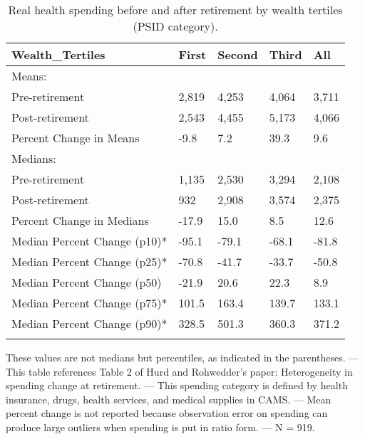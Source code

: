 \begin{table}[tbp] \centering
{}

\caption{Real health spending before and after retirement by wealth tertiles (PSID category).}
\begin{tabularx}{\textwidth}{lCCCC}

\toprule
{Wealth\_Tertiles}&{First}&{Second}&{Third}&{All} \tabularnewline
\midrule\addlinespace[1.5ex]
Means:&&&& \tabularnewline
\midrule Pre-retirement&2,819&4,253&4,064&3,711 \tabularnewline
Post-retirement&2,543&4,455&5,173&4,066 \tabularnewline
Percent Change in Means&-9.8&7.2&39.3&9.6 \tabularnewline
\midrule Medians:&&&& \tabularnewline
\midrule Pre-retirement&1,135&2,530&3,294&2,108 \tabularnewline
Post-retirement&932&2,908&3,574&2,375 \tabularnewline
Percent Change in Medians&-17.9&15.0&8.5&12.6 \tabularnewline
Median Percent Change (p10)*&-95.1&-79.1&-68.1&-81.8 \tabularnewline
Median Percent Change (p25)*&-70.8&-41.7&-33.7&-50.8 \tabularnewline
Median Percent Change (p50)&-21.9&20.6&22.3&8.9 \tabularnewline
Median Percent Change (p75)*&101.5&163.4&139.7&133.1 \tabularnewline
Median Percent Change (p90)*&328.5&501.3&360.3&371.2 \tabularnewline
\bottomrule \addlinespace[1.5ex]

\end{tabularx}
\begin{flushleft}
\footnotesize *These values are not medians but percentiles, as indicated in the parentheses. \linebreak --- \linebreak This table references Table 2 of Hurd and Rohwedder's paper: Heterogeneity in spending change at retirement. \linebreak --- \linebreak This spending category is defined by health insurance, drugs, health services, and medical supplies in CAMS. \linebreak --- \linebreak Mean percent change is not reported because observation error on spending can produce large outliers when spending is put in ratio form. \linebreak --- \linebreak N = 919.
\end{flushleft}
\end{table}
